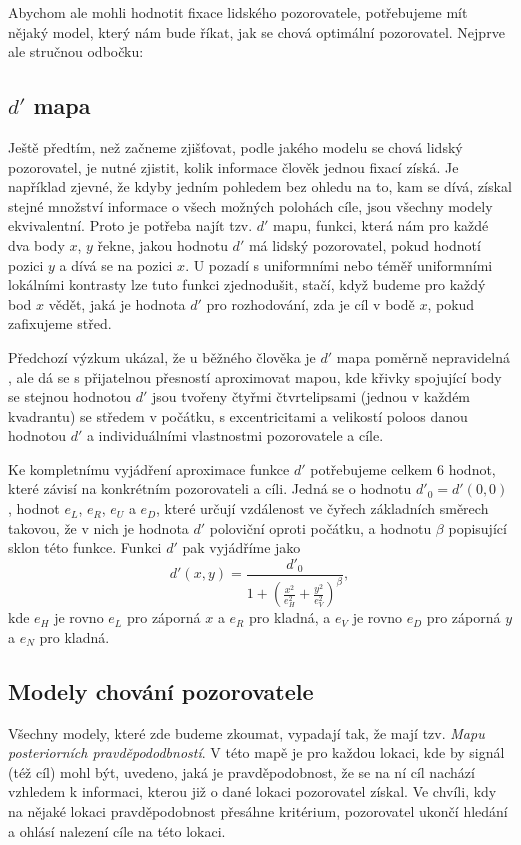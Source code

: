 Abychom ale mohli hodnotit fixace lidského pozorovatele, potřebujeme mít nějaký
model, který nám bude říkat, jak se chová optimální pozorovatel. Nejprve ale
stručnou odbočku:

\subsection{$d'$ mapa}

Ještě předtím, než začneme zjišťovat, podle jakého modelu se chová lidský
pozorovatel, je nutné zjistit, kolik informace člověk jednou fixací získá. Je
například zjevné, že kdyby jedním pohledem bez ohledu na to, kam se dívá,
získal stejné množství informace o všech možných polohách cíle, jsou všechny
modely ekvivalentní. Proto je potřeba najít tzv. $d'$ mapu, funkci, která nám
pro každé dva body $x$, $y$ řekne, jakou hodnotu $d'$ má lidský pozorovatel,
pokud hodnotí pozici $y$ a dívá se na pozici $x$. U pozadí s uniformními nebo
téměř uniformními lokálními kontrasty lze tuto funkci zjednodušit, stačí, když
budeme pro každý bod $x$ vědět, jaká je hodnota $d'$ pro rozhodování, zda je
cíl v bodě $x$, pokud zafixujeme střed.

Předchozí výzkum ukázal, že u běžného člověka je $d'$ mapa poměrně
nepravidelná \citep{Najemnik08}, ale dá se s přijatelnou přesností aproximovat mapou, kde křivky
spojující body se stejnou hodnotou $d'$ jsou tvořeny čtyřmi čtvrtelipsami
(jednou v každém kvadrantu) se středem v počátku, s
excentricitami a velikostí poloos danou hodnotou $d'$ a individuálními
vlastnostmi pozorovatele a cíle. 

Ke kompletnímu vyjádření aproximace funkce $d'$ potřebujeme celkem 6 hodnot,
které závisí na konkrétním pozorovateli a cíli. Jedná se o hodnotu $d'_0 =
d'(0,0)$, hodnot $e_L$, $e_R$, $e_U$ a $e_D$, které určují vzdálenost ve čyřech
základních směrech takovou, že v nich je hodnota $d'$ poloviční oproti počátku,
a hodnotu $\beta$ popisující sklon této funkce. Funkci $d'$ pak vyjádříme jako
$$ d'(x,y) = \frac{d'_0}{1+\left(\frac{x^2}{e_H^2}+\frac{y^2}{e_V^2}
\right)^\beta}, $$ kde $e_H$ je rovno $e_L$ pro záporná $x$ a $e_R$ pro kladná,
a $e_V$ je rovno $e_D$ pro záporná $y$ a $e_N$ pro kladná.


\subsection{Modely chování pozorovatele}

Všechny modely, které zde budeme zkoumat, vypadají tak, že mají tzv. {\it Mapu
posteriorních pravděpododbností}. V této mapě je pro každou lokaci, kde by
signál (též cíl) mohl být, uvedeno, jaká je pravděpodobnost, že se na ní cíl
nachází vzhledem k informaci, kterou již o dané lokaci pozorovatel získal. Ve
chvíli, kdy na nějaké lokaci pravděpodobnost přesáhne kritérium, pozorovatel
ukončí hledání a ohlásí nalezení cíle na této lokaci.

